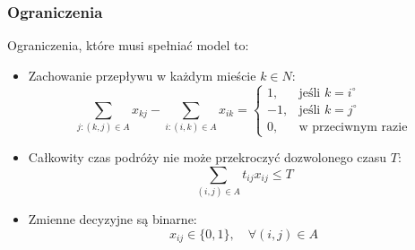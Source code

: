 \documentclass[11pt,a4paper]{article}
\numberwithin{equation}{section}
\begin{document}
\subsubsection{Ograniczenia}
Ograniczenia, które musi spełniać model to:
\begin{itemize}
    \item Zachowanie przepływu w każdym mieście $k \in N$:
        \[
            \sum_{j: (k,j) \in A} x_{kj} - \sum_{i: (i,k) \in A} x_{ik} =
            \begin{cases}
                1, & \text{jeśli } k = i^{\circ} \\
                -1, & \text{jeśli } k = j^{\circ} \\
                0, & \text{w przeciwnym razie}
            \end{cases}
        \]
    \item Całkowity czas podróży nie może przekroczyć dozwolonego czasu $T$:
        \[
            \sum_{(i,j) \in A} t_{ij} x_{ij} \leq T
        \]
    \item Zmienne decyzyjne są binarne:
        \[
            x_{ij} \in \{0,1\}, \quad \forall (i,j) \in A
        \]
\end{itemize}
\end{document}
